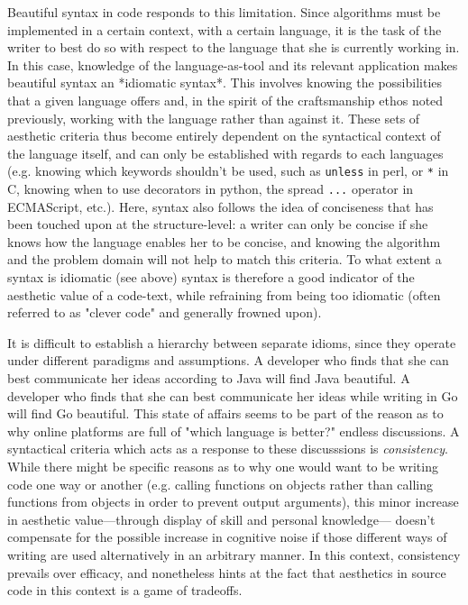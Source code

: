 Beautiful syntax in code responds to this limitation. Since algorithms must be implemented in a certain context, with a certain language, it is the task of the writer to best do so with respect to the language that she is currently working in. In this case, knowledge of the language-as-tool and its relevant application makes beautiful syntax an *idiomatic syntax*. This involves knowing the possibilities that a given language offers and, in the spirit of the craftsmanship ethos noted previously, working with the language rather than against it. These sets of aesthetic criteria thus become entirely dependent on the syntactical context of the language itself, and can only be established with regards to each languages (e.g. knowing which keywords shouldn't be used, such as \lstinline{unless} in perl, or \lstinline{*} in C, knowing when to use decorators in python, the spread \lstinline{...} operator in ECMAScript, etc.). Here, syntax also follows the idea of conciseness that has been touched upon at the structure-level: a writer can only be concise if she knows how the language enables her to be concise, and knowing the algorithm and the problem domain will not help to match this criteria. To what extent a syntax is idiomatic (see above) syntax is therefore a good indicator of the aesthetic value of a code-text, while refraining from being too idiomatic (often referred to as "clever code" and generally frowned upon).

It is difficult to establish a hierarchy between separate idioms, since they operate under different paradigms and assumptions. A developer who finds that she can best communicate her ideas according to Java will find Java beautiful. A developer who finds that she can best communicate her ideas while writing in Go will find Go beautiful. This state of affairs seems to be part of the reason as to why online platforms are full of "which language is better?" endless discussions. A syntactical criteria which acts as a response to these discusssions is \emph{consistency}. While there might be specific reasons as to why one would want to be writing code one way or another (e.g. calling functions on objects rather than calling functions from objects in order to prevent output arguments), this minor increase in aesthetic value—through display of skill and personal knowledge— doesn't compensate for the possible increase in cognitive noise if those different ways of writing are used alternatively in an arbitrary manner. In this context, consistency prevails over efficacy, and nonetheless hints at the fact that aesthetics in source code in this context is a game of tradeoffs.

